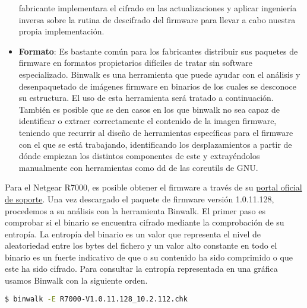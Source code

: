 \begin{itemize}
    fabricante implementara el cifrado en las actualizaciones y aplicar ingeniería inversa sobre la rutina de descifrado del firmware para llevar a cabo nuestra propia implementación. 
    \item \textbf{Formato}: Es bastante común para los fabricantes distribuir sus paquetes de firmware en formatos propietarios difíciles de tratar sin software especializado. 
    Binwalk\cite{binwalk} es una herramienta que puede ayudar con el análisis y desenpaquetado de imágenes firmware en binarios de los cuales se desconoce su estructura. El uso de esta herramienta
    será tratado a continuación. También es posible que se den casos en los que binwalk no sea capaz de identificar o extraer correctamente el contenido de la imagen firmware, 
    teniendo que recurrir al diseño de herramientas específicas para el firmware con el que se está trabajando, identificando los desplazamientos a partir de dónde empiezan los distintos 
    componentes de este y extrayéndolos manualmente con herramientas como dd de las coreutils de GNU.
\end{itemize}

Para el Netgear R7000, es posible obtener el firmware a través de su \href{https://www.netgear.es/support/product/r7000.aspx#download}{portal oficial de soporte}. Una vez 
descargado el paquete de firmware versión 1.0.11.128, procedemos a su análisis con la herramienta Binwalk. El primer paso es comprobar si el binario se encuentra cifrado mediante 
la comprobación de su entropía. La entropía del binario es un valor que representa el nivel de aleatoriedad entre los bytes del fichero y un valor alto constante
en todo el binario es un fuerte indicativo de que o su contenido ha sido comprimido o que este ha sido cifrado. Para consultar la entropía representada en una gráfica usamos Binwalk con la siguiente orden. 
\begin{lstlisting}[language=bash]
  $ binwalk -E R7000-V1.0.11.128_10.2.112.chk
\end{lstlisting}


